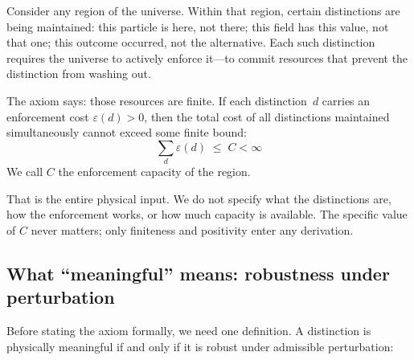 \documentclass[11pt]{article}
\begin{document}
Consider any region of the universe.  Within that region, certain distinctions are being maintained: this particle is here, not there; this field has this value, not that one; this outcome occurred, not the alternative.  Each such distinction requires the universe to actively enforce it---to commit resources that prevent the distinction from washing out.

The axiom says: those resources are finite.  If each distinction~$d$ carries an enforcement cost $\varepsilon(d) > 0$, then the total cost of all distinctions maintained simultaneously cannot exceed some finite bound:
\begin{equation}
\sum_d \varepsilon(d) \;\le\; C < \infty
\end{equation}
We call $C$ the enforcement capacity of the region.

That is the entire physical input.  We do not specify what the distinctions are, how the enforcement works, or how much capacity is available.  The specific value of $C$ never matters; only finiteness and positivity enter any derivation.

\subsection{What ``meaningful'' means: robustness under perturbation}

Before stating the axiom formally, we need one definition.  A distinction is physically meaningful if and only if it is robust under admissible perturbation:
\end{document}
